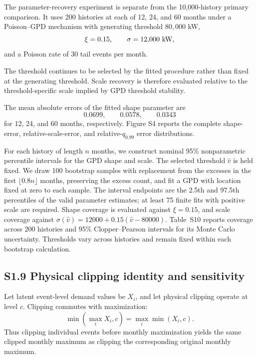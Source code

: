 \documentclass[]{interact}
\begin{document}
The parameter-recovery experiment is separate from the 10,000-history
primary comparison. It uses 200 histories at each of 12, 24, and
60 months under a Poisson--GPD mechanism with generating threshold
\(80{,}000\) kW,
\[
\xi=0.15,
\qquad
\sigma=12{,}000\ {\rm kW},
\]
and a Poisson rate of 30 tail events per month.

The threshold continues to be selected by the fitted procedure rather
than fixed at the generating threshold. Scale recovery is therefore
evaluated relative to the threshold-specific scale implied by GPD
threshold stability.

The mean absolute errors of the fitted shape parameter are
\[
0.0699,\qquad
0.0578,\qquad
0.0343
\]
for 12, 24, and 60 months, respectively. Figure S4 reports the
complete shape-error, relative-scale-error, and relative-\(q_{0.99}\)
error distributions.

\FloatBarrier

For each history of length \(n\) months, we construct nominal 95\%
nonparametric percentile intervals for the GPD shape and scale.
The selected threshold \(\widehat v\) is held fixed. We draw 100
bootstrap samples with replacement from the excesses in the first
\(\lfloor0.8n\rfloor\) months, preserving the excess count, and fit
a GPD with location fixed at zero to each sample. The interval
endpoints are the 2.5th and 97.5th percentiles of the valid parameter
estimates; at least 75 finite fits with positive scale are required.
Shape coverage is evaluated against \(\xi=0.15\), and scale coverage
against \(\sigma(\widehat v)=12000+0.15(\widehat v-80000)\).
Table~S10 reports coverage across 200 histories and 95\%
Clopper--Pearson intervals for its Monte Carlo uncertainty.
Thresholds vary across histories and remain fixed within each
bootstrap calculation.



\subsection*{S1.9 Physical clipping identity and sensitivity}

Let latent event-level demand values be \(X_i\), and let physical
clipping operate at level \(c\). Clipping commutes with maximization:
\[
\min\left(\max_iX_i,c\right)
=
\max_i\min(X_i,c).
\]
Thus clipping individual events before monthly maximization yields the
same clipped monthly maximum as clipping the corresponding original
monthly maximum.
\end{document}
